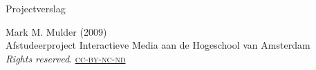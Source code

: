 \thispagestyle{empty}

\begin{flushleft}

  \Huge
  Projectverslag\\

  \vfill{}

  \small
  Mark M. Mulder (2009) \\
  Afstudeerproject Interactieve Media aan de Hogeschool van Amsterdam
  \\\emph{Rights reserved}.  \href{http://creativecommons.org/licenses/by-nc-nd/3.0/nl/}{\textsc{cc-by-nc-nd}}

\end{flushleft}
\pagebreak
\normalsize